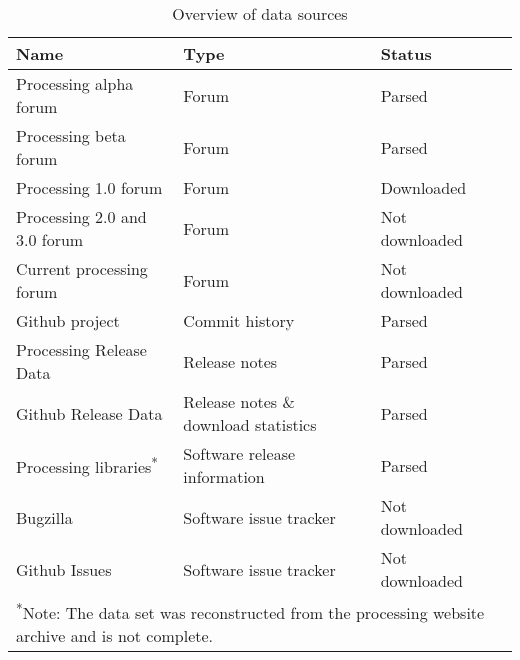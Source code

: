 \begin{table}[h]
    \raggedright
     \label{table:data-sources}
    \begin{tabular}{l l l c}
        \toprule
        Name & Type & Status \\
        \midrule
        Processing alpha forum & Forum & Parsed \\
        Processing beta forum & Forum & Parsed  \\
        Processing 1.0 forum & Forum & Downloaded \\
        Processing 2.0 and 3.0 forum & Forum  & Not downloaded \\
        Current processing forum & Forum & Not downloaded\\
        Github project & Commit history & Parsed \\
        Processing Release Data & Release notes & Parsed \\
        Github Release Data & Release notes \& download statistics & Parsed \\
        Processing libraries\textsuperscript{*} & Software release information & Parsed \\
        Bugzilla & Software issue tracker & Not downloaded \\
        Github Issues & Software issue tracker & Not downloaded \\
        \bottomrule
        \multicolumn{3}{l}{\footnotesize \textsuperscript{*}Note: The data set was reconstructed from the processing website archive and is not complete.}
    \end{tabular}
    \caption[Data sources]{Overview of data sources}
 
  \end{table}
